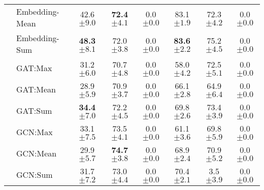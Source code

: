 \begin{table}
{\begin{tabular}{@{}c <{\enspace}@{}lcccccc@{}}
			& \textsf{Embedding-Mean}     & 42.6 \scriptsize	$\pm 9.0$ & \textbf{72.4}     \scriptsize $\pm 4.1 $         & 0.0 \scriptsize $\pm 0.0$            & 83.1   \scriptsize $\pm 1.9$         & 72.3  \scriptsize $\pm 4.2$         &  0.0 \scriptsize $\pm 0.0$                     
			\\ 
			& \textsf{Embedding-Sum} & \textbf{48.3} \scriptsize	$\pm 8.1$          & 72.0  \scriptsize $\pm 3.8$             & 0.0 \scriptsize $\pm 0.0$            & \textbf{83.6}   \scriptsize $\pm 2.2$         & 75.2  \scriptsize $\pm 4.5$   	& 0.0  \scriptsize $\pm 0.0$                     
			\\ 
			\cmidrule{2-8}
			\multirow{9}{*}{\rotatebox{90}{Graph Neural Networks}} 
			& \textsf{GAT:Max}                    & 31.2 \scriptsize $\pm 6.0$        & 70.7 \scriptsize $\pm 4.8$          & 0.0 \scriptsize $\pm 0.0$            & 58.0 \scriptsize $\pm 4.2$          & 72.5 \scriptsize $\pm 5.1$         & 0.0 \scriptsize $\pm 0.0$  
			\\ 
			& \textsf{GAT:Mean}    & 28.9 \scriptsize $\pm 5.9$          & 70.9 \scriptsize $\pm 3.7$           & 0.0 \scriptsize $\pm 0.0$            & 66.1 \scriptsize $\pm 2.8$         & 64.9 \scriptsize $\pm 6.4$       & 0.0 \scriptsize $\pm 0.0$
			\\ 
			& \textsf{GAT:Sum}                  & \textbf{34.4} \scriptsize $\pm 7.0$          & 72.2 \scriptsize $\pm 4.5$	            & 0.0 \scriptsize $\pm 0.0$            & 69.8 \scriptsize $\pm 2.6$	          & 73.4 \scriptsize $\pm 3.9$
			& 0.0 \scriptsize $\pm 0.0$          
			\\
			
			\cmidrule{2-8}
					
			& \textsf{GCN:Max} & 33.1 \scriptsize $\pm 7.5$ &	73.5 \scriptsize $\pm 4.1$	& 0.0 \scriptsize $\pm 0.0$ & 61.1 \scriptsize $\pm 3.6$ &	69.8 \scriptsize $\pm 5.9$ & 0.0 \scriptsize $\pm 0.0$  
			\\ 
			& \textsf{GCN:Mean} & 29.9 \scriptsize $\pm 5.7$ &	\textbf{74.7} \scriptsize $\pm 3.8$ & 0.0 \scriptsize $\pm 0.0$ &	68.9 \scriptsize $\pm 2.4$ &	70.9 \scriptsize $\pm 5.2$ & 0.0 \scriptsize $\pm 0.0$
			\\ 
			& \textsf{GCN:Sum} & 31.7 \scriptsize $\pm 7.2$ &	73.0 \scriptsize $\pm 4.4$	& 0.0 \scriptsize $\pm 0.0$ & 70.4 \scriptsize $\pm 2.1$ & 3.5 \scriptsize $\pm 3.9$ & 0.0 \scriptsize $\pm 0.0$                        
			\\
			\cmidrule{2-8}	
						

\end{tabular}}
\end{table}
